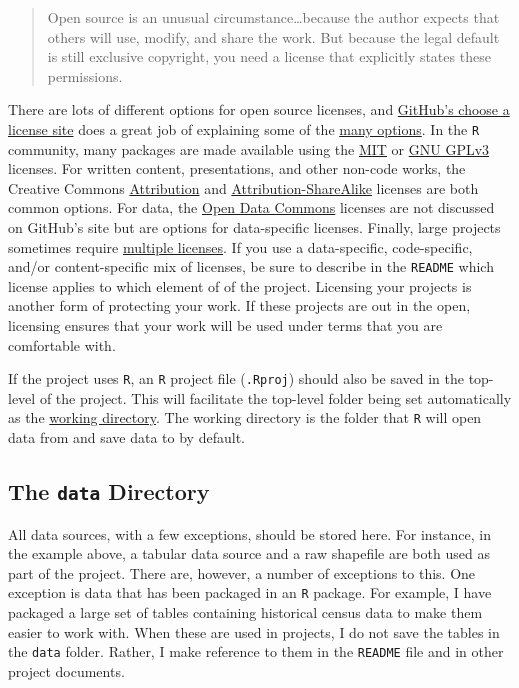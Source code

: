 \documentclass[]{book}
\theoremstyle{definition}
\theoremstyle{definition}
\theoremstyle{definition}
\theoremstyle{remark}
\begin{document}
\begin{quote}
Open source is an unusual circumstance\ldots{}because the author expects
that others will use, modify, and share the work. But because the legal
default is still exclusive copyright, you need a license that explicitly
states these permissions.
\end{quote}

There are lots of different options for open source licenses, and
\href{https://choosealicense.com}{GitHub's choose a license site} does a
great job of explaining some of the
\href{https://choosealicense.com/appendix/}{many options}. In the
\texttt{R} community, many packages are made available using the
\href{https://choosealicense.com/licenses/mit/}{MIT} or
\href{https://choosealicense.com/licenses/gpl-3.0/}{GNU GPLv3} licenses.
For written content, presentations, and other non-code works, the
Creative Commons
\href{https://choosealicense.com/licenses/cc-by-4.0/}{Attribution} and
\href{https://choosealicense.com/licenses/cc-by-sa-4.0/}{Attribution-ShareAlike}
licenses are both common options. For data, the
\href{https://opendatacommons.org}{Open Data Commons} licenses are not
discussed on GitHub's site but are options for data-specific licenses.
Finally, large projects sometimes require
\href{https://choosealicense.com/non-software/}{multiple licenses}. If
you use a data-specific, code-specific, and/or content-specific mix of
licenses, be sure to describe in the \texttt{README} which license
applies to which element of of the project. Licensing your projects is
another form of protecting your work. If these projects are out in the
open, licensing ensures that your work will be used under terms that you
are comfortable with.

If the project uses \texttt{R}, an \texttt{R} project file
(\texttt{.Rproj}) should also be saved in the top-level of the project.
This will facilitate the top-level folder being set automatically as the
\href{https://en.wikipedia.org/wiki/Working_directory}{working
directory}. The working directory is the folder that \texttt{R} will
open data from and save data to by default.

\subsection{\texorpdfstring{The \texttt{data}
Directory}{The data Directory}}\label{the-data-directory}

All data sources, with a few exceptions, should be stored here. For
instance, in the example above, a tabular data source and a raw
shapefile are both used as part of the project. There are, however, a
number of exceptions to this. One exception is data that has been
packaged in an \texttt{R} package. For example, I have packaged a large
set of tables containing historical census data to make them easier to
work with. When these are used in projects, I do not save the tables in
the \texttt{data} folder. Rather, I make reference to them in the
\texttt{README} file and in other project documents.
\end{document}
